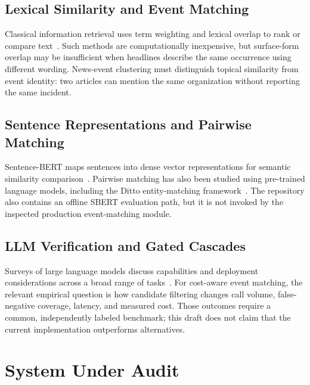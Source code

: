 \documentclass[conference]{IEEEtran}
\begin{document}
\subsection{Lexical Similarity and Event Matching}
Classical information retrieval uses term weighting and lexical overlap to rank or compare text~\cite{salton1988,aggarwal2012}. Such methods are computationally inexpensive, but surface-form overlap may be insufficient when headlines describe the same occurrence using different wording. News-event clustering must distinguish topical similarity from event identity: two articles can mention the same organization without reporting the same incident.

\subsection{Sentence Representations and Pairwise Matching}

Sentence-BERT maps sentences into dense vector representations for semantic similarity comparison~\cite{reimers2019sentence}. Pairwise matching has also been studied using pre-trained language models, including the Ditto entity-matching framework~\cite{li2020ditto}.
The repository also contains an offline SBERT evaluation path, but it is not invoked by the inspected production event-matching module.

\subsection{LLM Verification and Gated Cascades}
Surveys of large language models discuss capabilities and deployment considerations across a broad range of tasks~\cite{zhao2023}. For cost-aware event matching, the relevant empirical question is how candidate filtering changes call volume, false-negative coverage, latency, and measured cost. Those outcomes require a common, independently labeled benchmark; this draft does not claim that the current implementation outperforms alternatives.

\section{System Under Audit}
\end{document}
